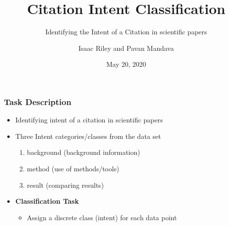 \documentclass[
  xcolor={svgnames},
  hyperref={colorlinks,citecolor=DeepPink4,linkcolor=DarkRed,urlcolor=DarkBlue}
  ]{beamer}
\title[] %
{Citation Intent Classification}
\subtitle{Identifying the Intent of a Citation in scientific papers}
\author[tmip, hieutt] %
{Isaac Riley and Pavan Mandava}
\institute[Universities Here and There] %
{
  \inst{1}%
  Computational Linguistics, M.Sc.\\
  \and
  \inst{2}%
  Computational Linguistics, M.Sc.\\
}
\date[] %
{May 20, 2020}
\begin{document}
\begin{frame}
\titlepage
\end{frame}


\begin{frame}
\frametitle{Task Description}

\begin{itemize}

\item Identifying intent of a citation in scientific papers
\bigskip
\item Three Intent categories/classes from the data set
	\begin{enumerate}
		\item background (background information)
		\item method (use of methods/tools)
		\item result (comparing results)
	\end{enumerate}
\bigskip
\item {\bf Classification Task }
	\begin{itemize}
		\item Assign a discrete class (intent) for each data point
	\end{itemize}
\end{itemize}

\end{frame}
\end{document}
